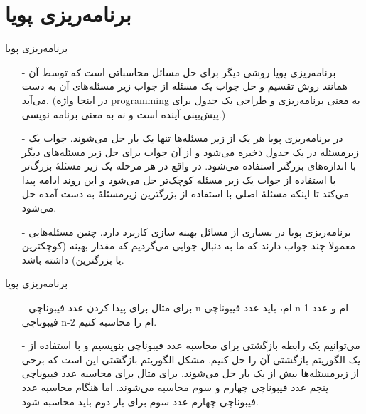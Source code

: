 \section{برنامه‌ریزی پویا}

\begin{frame}{‌برنامه‌ریزی پویا}
\begin{itemize}\itemr
\item[-]
برنامه‌ریزی پویا
روشی دیگر برای حل مسائل محاسباتی است که توسط آن همانند روش تقسیم و حل جواب یک مسئله از جواب زیر مسئله‌های آن به دست می‌آید.
{\footnotesize{
(در اینجا واژه
programming
به معنی برنامه‌ریزی و طراحی یک جدول برای پیش‌بینی آینده است و نه به معنی برنامه نویسی.)
}}
\item[-]
در برنامه‌ریزی پویا هر یک از زیر مسئله‌ها تنها یک بار حل می‌شوند. جواب یک زیرمسئله در یک جدول ذخیره می‌شود و از آن جواب برای حل زیر مسئله‌های دیگر با اندازه‌های بزرگتر استفاده می‌شود. در واقع در هر مرحله یک زیر مسئلهٔ بزرگ‌تر با استفاده از جواب یک زیر مسئله کوچک‌تر حل می‌شود و این روند ادامه پیدا می‌کند تا اینکه مسئلهٔ اصلی با استفاده از بزرگترین زیرمسئلهٔ به دست آمده حل می‌شود.
\item[-]
برنامه‌ریزی پویا در بسیاری از مسائل بهینه سازی
کاربرد دارد. چنین مسئله‌هایی معمولا چند جواب دارند که ما به دنبال جوابی می‌گردیم که مقدار بهینه (کوچکترین یا بزرگترین) داشته باشد.
\end{itemize}
\end{frame}



\begin{frame}{‌برنامه‌ریزی پویا}
\begin{itemize}\itemr
\item[-]
برای مثال برای پیدا کردن عدد فیبوناچی n ام، باید عدد فیبوناچی n-1 ام و عدد فیبوناچی n-2 ام را محاسبه کنیم.
\item[-]
می‌توانیم یک رابطه بازگشتی برای محاسبه عدد فیبوناچی بنویسیم و با استفاده از یک الگوریتم بازگشتی آن را حل کنیم. مشکل الگوریتم بازگشتی این است که برخی از زیرمسئله‌ها بیش از یک بار حل می‌شوند. برای مثال برای محاسبه عدد فیبوناچی پنجم عدد فیبوناچی چهارم و سوم محاسبه می‌شوند. اما هنگام محاسبه عدد فیبوناچی چهارم عدد سوم برای بار دوم باید محاسبه شود.
\end{itemize}
\end{frame}

